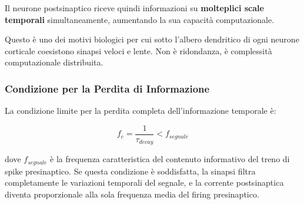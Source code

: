 Il neurone postsinaptico riceve quindi informazioni su \textbf{molteplici scale temporali} simultaneamente, aumentando la sua capacità computazionale.

\begin{tcolorbox}[colback=gray!5, colframe=gray!40, arc=2mm, boxrule=0.5pt]
 Questo è uno dei motivi biologici per cui sotto l'albero dendritico di ogni neurone corticale coesistono sinapsi veloci e lente. Non è ridondanza, è complessità computazionale distribuita.
\end{tcolorbox}

\subsubsection{Condizione per la Perdita di Informazione}

La condizione limite per la perdita completa dell'informazione temporale è:

\begin{equation}
f_c = \frac{1}{\tau_{decay}} < f_{segnale}
\end{equation}

dove $f_{segnale}$ è la frequenza caratteristica del contenuto informativo del treno di spike presinaptico. Se questa condizione è soddisfatta, la sinapsi filtra completamente le variazioni temporali del segnale, e la corrente postsinaptica diventa proporzionale alla sola frequenza media del firing presinaptico.

